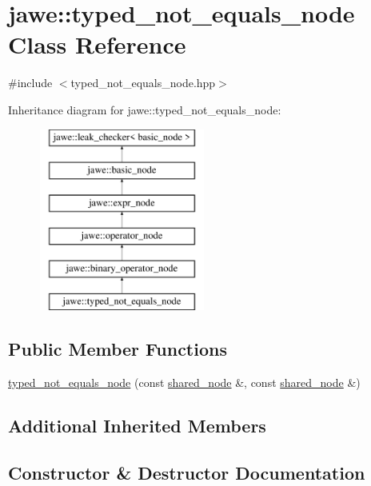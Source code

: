 \hypertarget{classjawe_1_1typed__not__equals__node}{}\section{jawe\+:\+:typed\+\_\+not\+\_\+equals\+\_\+node Class Reference}
\label{classjawe_1_1typed__not__equals__node}


{\ttfamily \#include $<$typed\+\_\+not\+\_\+equals\+\_\+node.\+hpp$>$}

Inheritance diagram for jawe\+:\+:typed\+\_\+not\+\_\+equals\+\_\+node\+:\begin{figure}[H]
\begin{center}
\leavevmode
\includegraphics[height=6.000000cm]{classjawe_1_1typed__not__equals__node}
\end{center}
\end{figure}
\subsection*{Public Member Functions}
\begin{DoxyCompactItemize}
\item 
\hyperlink{classjawe_1_1typed__not__equals__node_a67083192e81f49868f37704eb4895b94}{typed\+\_\+not\+\_\+equals\+\_\+node} (const \hyperlink{namespacejawe_a3f307481d921b6cbb50cc8511fc2b544}{shared\+\_\+node} \&, const \hyperlink{namespacejawe_a3f307481d921b6cbb50cc8511fc2b544}{shared\+\_\+node} \&)
\end{DoxyCompactItemize}
\subsection*{Additional Inherited Members}


\subsection{Constructor \& Destructor Documentation}
\mbox{\label{classjawe_1_1typed__not__equals__node_a67083192e81f49868f37704eb4895b94}} 
